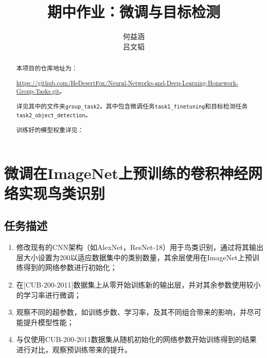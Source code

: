 \documentclass[notitlepage,cs4size,punct,oneside]{ctexrep}
\title{{\zihao{1}\bfseries 期中作业：微调与目标检测}}
\author{何益涵 \quad 20307110032\\吕文韬 \quad }
\date{}
\numberwithin{equation}{chapter}
\theoremstyle{mystyle}
\begin{document}
\CTEXoptions[abstractname={摘要: }]
\CTEXoptions[bibname={\bfseries 参考文献}]

\renewcommand{\thepage}{\roman{page}}
\setcounter{page}{1}

\maketitle\renewcommand{\thepage}{\arabic{page}}
\thispagestyle{empty}\setcounter{page}{0}
\renewcommand{\abstractname}{摘要: }
\begin{abstract}
     本项目的仓库地址为：

     \url{https://github.com/HeDesertFox/Neural-Networks-and-Deep-Learning-Homework-Group-Tasks.git}。

     详见其中的文件夹\texttt{group\_task2}。其中包含微调任务\texttt{task1\_finetuning}和目标检测任务\texttt{task2\_object\_detection}。

     训练好的模型权重详见：\\



\end{abstract}



\chapter{微调在ImageNet上预训练的卷积神经网络实现鸟类识别}
\section{任务描述}
\begin{enumerate}
\item 修改现有的CNN架构（如AlexNet，ResNet-18）用于鸟类识别，通过将其输出层大小设置为200以适应数据集中的类别数量，其余层使用在ImageNet上预训练得到的网络参数进行初始化；
\item 在[CUB-200-2011]数据集上从零开始训练新的输出层，并对其余参数使用较小的学习率进行微调；
\item 观察不同的超参数，如训练步数、学习率，及其不同组合带来的影响，并尽可能提升模型性能；
\item 与仅使用CUB-200-2011数据集从随机初始化的网络参数开始训练得到的结果进行对比，观察预训练带来的提升。
\end{enumerate}
\end{document}
